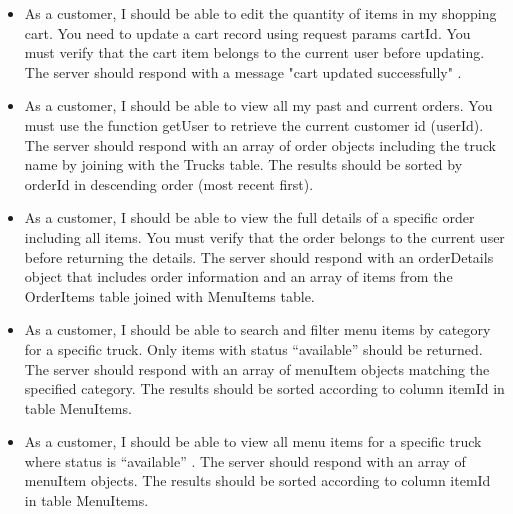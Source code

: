 \documentclass[12pt,a4paper]{article}
\begin{document}
\newpage

\begin{storybox}
\begin{itemize}[leftmargin=1em, itemsep=6pt]
    \item As a customer, I should be able to edit the quantity of items in my shopping cart. You need to update a cart record using request params cartId. You must verify that the cart item belongs to the current user before updating. The server should respond with a message "cart updated successfully" .
    \item As a customer, I should be able to view all my past and current orders. You must use the function getUser to retrieve the current customer id (userId). The server should respond with an array of order objects including the truck name by joining with the Trucks table. The results should be sorted by orderId in descending order (most recent first).
    \item As a customer, I should be able to view the full details of a specific order including all items. You must verify that the order belongs to the current user before returning the details. The server should respond with an orderDetails object that includes order information and an array of items from the OrderItems table joined with MenuItems table.
    \item As a customer, I should be able to search and filter menu items by category for a specific truck. Only items with status “available” should be returned. The server should respond with an array of menuItem objects matching the specified category. The results should be sorted according to column itemId in table MenuItems.
    \item As a customer, I should be able to view all menu items for a specific truck where status is “available” . The server should respond with an array of menuItem objects. The results should be sorted according to column itemId in table MenuItems.    
    
\end{itemize}
\end{storybox}

\vspace{1em}
\end{document}
